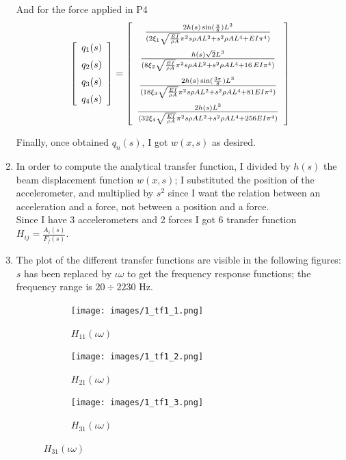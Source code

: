\documentclass[11pt,a4paper]{article}
\begin{document}
\begin{enumerate}
	And for the force applied in P4
	\begin{equation*}
	\left[ \begin {array}{c} {q_1}(s) \\ \noalign{\medskip}{q_2}(s) \\ \noalign{\medskip}{q_3}(s) \\ \noalign{\medskip}{q_4}(s) \end {array} \right] = \left[ \begin {array}{c} \frac{2h(s)\sin(\frac {\pi}{8}){L}^{3}}{(2\xi_{{1}}\sqrt{{\frac {EI}{\rho A}}}{\pi}^{2}s\rho A{L}^{2}+{s}^{2}\rho A{L}^{4}+EI{\pi}^{4})}\\ \noalign{\medskip}\frac{h(s)\sqrt{2}{L}^{3}} {(8\xi_{{2}}\sqrt{{\frac{EI}{\rho A}}}{\pi}
		^{2}s\rho A{L}^{2}+{s}^{2}\rho A{L}^{4}+16\,EI{\pi}^{4})}\\ \noalign{\medskip}\frac{2h(s)\sin(\frac {3\pi}{8}){L}^{3}}{(18\xi_{{3}}\sqrt {{\frac {EI}{\rho A}}}{\pi}^{2}s\rho A{L}^{2}+{s}^{2}\rho A{L}^{4}+81EI{\pi}^{4})}\\ \noalign{\medskip}\frac{2h(s){L}^{3}}{(32\xi_{{4}}\sqrt {{\frac {EI}{\rho A}}}{\pi}^{2}s\rho A{L}^{2}+{s}^{2}\rho A{L}^{4}+256EI{\pi}^{4})}\end {array} \right] 		 	
	\end{equation*}
	
	Finally, once obtained $q_n(s)$, I got $w(x,s)$ as desired.
	
	\medskip
	
	\item In order to compute the analytical transfer function, I divided by $h(s)$ the beam displacement function $w(x,s)$; I substituted the position of the accelerometer, and multiplied by $s^2$ since I want the relation between an acceleration and a force, not between a position and a force. \\
	Since I have 3 accelerometers and 2 forces I got 6 transfer function $H_{ij}=\frac{A_i(s)}{F_j(s)}$. 
	
	\medskip
	
	\item The plot of the different transfer functions are visible in the following figures: $s$ has been replaced by $\iota\omega$ to get the frequency response functions; the frequency range is {$20\div2230$} Hz.
	
	\begin{figure}[H]
		\centering
		\begin{subfigure}[b]{0.3\textwidth}
			\centering
			\texttt{[image: images/1\_tf1\_1.png]}
			\caption{$H_{11}(\iota\omega)$}
		\end{subfigure}
		\hfill
		\begin{subfigure}[b]{0.3\textwidth}
			\centering
			\texttt{[image: images/1\_tf1\_2.png]}
			\caption{$H_{21}(\iota\omega)$}
		\end{subfigure}
		\hfill
		\begin{subfigure}[b]{0.3\textwidth}
			\centering
			\texttt{[image: images/1\_tf1\_3.png]}
			\caption{$H_{31}(\iota\omega)$}
		\end{subfigure}
	\end{figure}


\end{enumerate}
\end{document}
